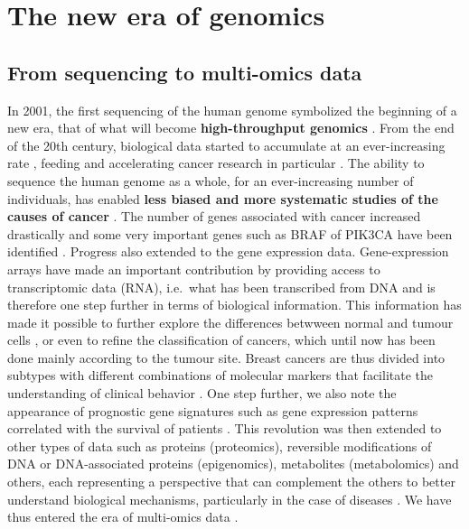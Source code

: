 \documentclass[a4paper,12pt,twoside,onecolumn,openright,final,oldfontcommands]{memoir}
\begin{document}
\section{The new era of genomics}\label{the-new-era-of-genomics}

\subsection{From sequencing to multi-omics
data}\label{from-sequencing-to-multi-omics-data}

In 2001, the first sequencing of the human genome symbolized the
beginning of a new era, that of what will become \textbf{high-throughput
genomics} \citep{lander2001initial, venter2001sequence}. From the end of
the 20th century, biological data started to accumulate at an
ever-increasing rate \citep{reuter2015high}, feeding and accelerating
cancer research in particular
\citep{stratton2009cancer, meyerson2010advances}. The ability to
sequence the human genome as a whole, for an ever-increasing number of
individuals, has enabled \textbf{less biased and more systematic studies
of the causes of cancer} \citep{lander2011initial}. The number of genes
associated with cancer increased drastically and some very important
genes such as BRAF of PIK3CA have been identified
\citep{davies2002mutations, samuels2004high}. Progress also extended to
the gene expression data. Gene-expression arrays have made an important
contribution by providing access to transcriptomic data (RNA), i.e.~what
has been transcribed from DNA and is therefore one step further in terms
of biological information. This information has made it possible to
further explore the differences betwween normal and tumour cells
\citep{perou1999distinctive}, or even to refine the classification of
cancers, which until now has been done mainly according to the tumour
site. Breast cancers are thus divided into subtypes with different
combinations of molecular markers that facilitate the understanding of
clinical behavior \citep{perou2000molecular}. One step further, we also
note the appearance of prognostic gene signatures such as gene
expression patterns correlated with the survival of patients
\citep{van2002gene}. This revolution was then extended to other types of
data such as proteins (proteomics), reversible modifications of DNA or
DNA-associated proteins (epigenomics), metabolites (metabolomics) and
others, each representing a perspective that can complement the others
to better understand biological mechanisms, particularly in the case of
diseases \citep{hasin2017multi}. We have thus entered the era of
multi-omics data \citep{vucic2012translating}.
\end{document}
